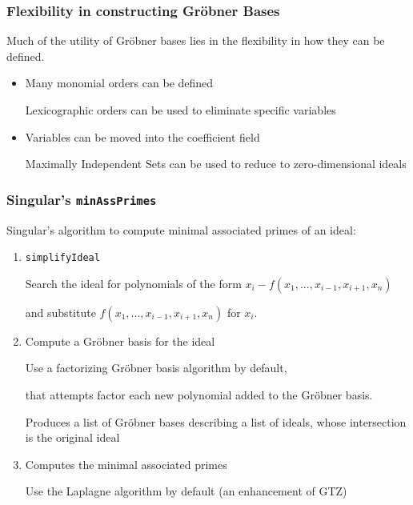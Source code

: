 \documentclass[11pt]{beamer}
\begin{document}
\begin{frame}
\frametitle{Flexibility in constructing Gr\"obner Bases}
Much of the utility of Gr\"obner bases lies in the flexibility in how they can be defined.
\begin{itemize}
\item Many monomial orders can be defined

Lexicographic orders can be used to eliminate specific variables

\vskip 12pt
\item Variables can be moved into the coefficient field

Maximally Independent Sets can be used to reduce to zero-dimensional ideals
\end{itemize}
\end{frame}

\begin{frame}
\frametitle{Singular's {\tt minAssPrimes}}
Singular's algorithm to compute minimal associated primes of an ideal:
\begin{enumerate}
\item {\tt simplifyIdeal}

Search the ideal for polynomials of the form $x_i-f(x_1,...,x_{i-1},x_{i+1},x_n)$

and substitute $f(x_1,...,x_{i-1},x_{i+1},x_n)$ for $x_i$.

\item Compute a Gr\"obner basis for the ideal

Use a factorizing Gr\"obner basis algorithm by default,

that attempts factor each new polynomial added to the Gr\"obner basis.

Produces a list of Gr\"obner bases describing a list of ideals, whose intersection is the original ideal

\item Computes the minimal associated primes

Use the Laplagne algorithm by default (an enhancement of GTZ)
\end{enumerate}
\end{frame}
\end{document}
